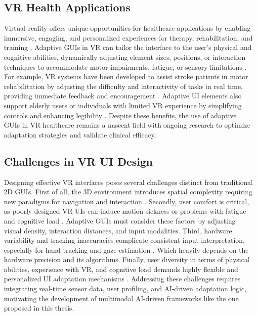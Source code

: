 \documentclass[openany]{book}
\begin{document}
\subsection{VR Health Applications}
Virtual reality offers unique opportunities for healthcare applications by enabling immersive, engaging, and personalized experiences for therapy, rehabilitation, and training \cite{Rizzo2017VRHealthcare}. Adaptive GUIs in VR can tailor the interface to the user’s physical and cognitive abilities, dynamically adjusting element sizes, positions, or interaction techniques to accommodate motor impairments, fatigue, or sensory limitations \cite{Freeman2020AdaptiveVR}.  
For example, VR systems have been developed to assist stroke patients in motor rehabilitation by adjusting the difficulty and interactivity of tasks in real time, providing immediate feedback and encouragement \cite{Laver2017VRStroke}. Adaptive UI elements also support elderly users or individuals with limited VR experience by simplifying controls and enhancing legibility \cite{Slater2020Usability}.  
Despite these benefits, the use of adaptive GUIs in VR healthcare remains a nascent field with ongoing research to optimize adaptation strategies and validate clinical efficacy.
     
\subsection{Challenges in VR UI Design}
Designing effective VR interfaces poses several challenges distinct from traditional 2D GUIs. First of all, the 3D environment introduces spatial complexity requiring new paradigms for navigation and interaction \cite{Bowman20023DUI}.  
Secondly, user comfort is critical, as poorly designed VR UIs can induce motion sickness or problems with fatigue and cognitive load \cite{LaViola2000VRSimulatorSickness}. Adaptive GUIs must consider these factors by adjusting visual density, interaction distances, and input modalities.  
Third, hardware variability and tracking inaccuracies complicate consistent input interpretation, especially for hand tracking and gaze estimation \cite{Jerald2015VRBook}. Which heavily depends on the hardware precision and its algorithms. 
Finally, user diversity in terms of physical abilities, experience with VR, and cognitive load demands highly flexible and personalized UI adaptation mechanisms \cite{Vasiljevic2017AdaptiveVRAccessibility}.  
Addressing these challenges requires integrating real-time sensor data, user profiling, and AI-driven adaptation logic, motivating the development of multimodal AI-driven frameworks like the one proposed in this thesis.
\end{document}
